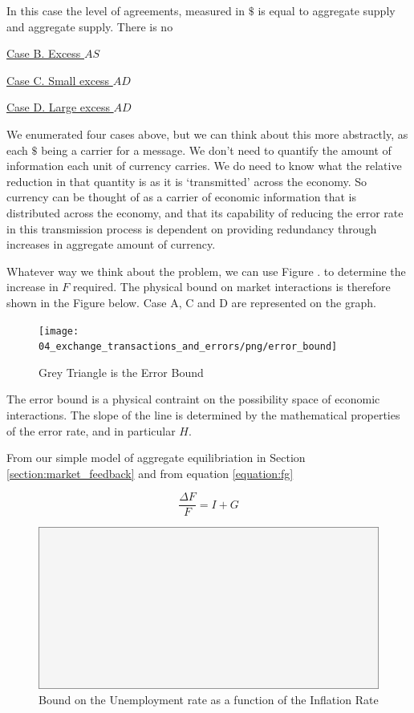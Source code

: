 In this case the level of agreements, measured in $\$$ is equal to aggregate supply and aggregate
supply. There is no  

\underline{Case B. Excess $AS$}

\underline{Case C. Small excess $AD$}

\underline{Case D. Large excess $AD$}

We enumerated four cases above, but we can think about this more abstractly, as each $\$$ being a
carrier for a message. We don't need to quantify the amount of information each unit of currency
carries. We do need to know what the relative reduction in that quantity is as it is `transmitted'
across the economy. So currency can be thought of as a carrier of economic information that is
distributed across the economy, and that its capability of reducing the error rate in this
transmission process is dependent on providing redundancy through increases in aggregate amount of
currency.

Whatever way we think about the problem, we can use Figure \label{fig:shannons_proof}. to determine the
increase in $F$ required. The physical bound on market interactions is therefore shown in the Figure
below. Case A, C and D are represented on the graph.

\begin{figure}[H]
\centering
\texttt{[image: 04\_exchange\_transactions\_and\_errors/png/error\_bound]}
\caption{Grey Triangle is the Error Bound}
\label{fig:error_bound}
\end{figure}

The error bound is a physical contraint on the possibility space of economic interactions. The slope
of the line is determined by the mathematical properties of the error rate, and in particular $H$.

From our simple model of aggregate equilibriation in Section \ref{section:market_feedback} and from
equation \ref{equation:fg}

\begin{equation}
    \frac {\Delta F} F = I + G
\end{equation}

\begin{figure}[H]
\centering
\includegraphics[scale=0.48]{blank}
\caption{Bound on the Unemployment rate as a function of the Inflation Rate}
\label{fig:ui_bound}
\end{figure}

